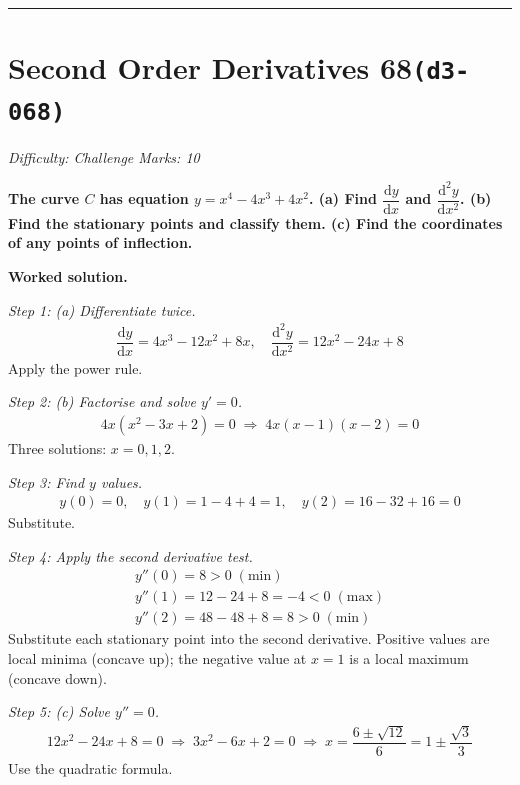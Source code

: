 \documentclass[11pt]{article}
\newcommand{\question}[1]{\par\medskip\noindent\textbf{#1}\par}
\begin{document}
\medskip\hrule

\section*{Second Order Derivatives 68\quad\small\texttt{(d3-068)}}
\textit{Difficulty: Challenge \quad\textbar\quad Marks: 10}

\question{The curve \( C \) has equation \( y = x^4 - 4x^3 + 4x^2 \). (a) Find \( \dfrac{\mathrm{d}y}{\mathrm{d}x} \) and \( \dfrac{\mathrm{d}^2y}{\mathrm{d}x^2} \). (b) Find the stationary points and classify them. (c) Find the coordinates of any points of inflection.}

\textbf{Worked solution.}

\textit{Step 1: (a) Differentiate twice.}
\[\begin{gathered}
\dfrac{\mathrm{d}y}{\mathrm{d}x} = 4x^3 - 12x^2 + 8x, \quad \dfrac{\mathrm{d}^2y}{\mathrm{d}x^2} = 12x^2 - 24x + 8
\end{gathered}\]
Apply the power rule.

\textit{Step 2: (b) Factorise and solve \( y' = 0 \).}
\[\begin{gathered}
4x(x^2 - 3x + 2) = 0 \;\Rightarrow\; 4x(x-1)(x-2) = 0
\end{gathered}\]
Three solutions: \( x = 0, 1, 2 \).

\textit{Step 3: Find \( y \) values.}
\[\begin{gathered}
y(0) = 0, \quad y(1) = 1 - 4 + 4 = 1, \quad y(2) = 16 - 32 + 16 = 0
\end{gathered}\]
Substitute.

\textit{Step 4: Apply the second derivative test.}
\[\begin{gathered}
y''(0) = 8 > 0 \; (\text{min}) \\ y''(1) = 12 - 24 + 8 = -4 < 0 \; (\text{max}) \\ y''(2) = 48 - 48 + 8 = 8 > 0 \; (\text{min})
\end{gathered}\]
Substitute each stationary point into the second derivative. Positive values are local minima (concave up); the negative value at \(x=1\) is a local maximum (concave down).

\textit{Step 5: (c) Solve \( y'' = 0 \).}
\[\begin{gathered}
12x^2 - 24x + 8 = 0 \;\Rightarrow\; 3x^2 - 6x + 2 = 0 \;\Rightarrow\; x = \dfrac{6 \pm \sqrt{12}}{6} = 1 \pm \dfrac{\sqrt{3}}{3}
\end{gathered}\]
Use the quadratic formula.
\end{document}
